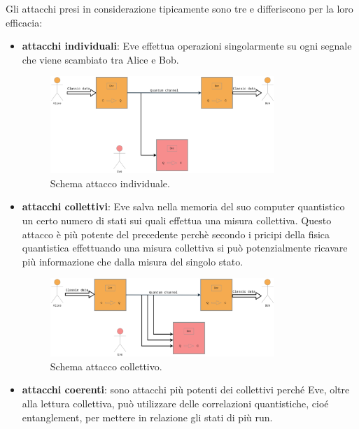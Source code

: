 Gli attacchi presi in considerazione tipicamente sono tre e differiscono per la loro efficacia:
\begin{itemize}
\item \textbf{attacchi individuali}: Eve effettua operazioni singolarmente su ogni segnale che viene scambiato tra Alice e Bob. 
\begin{figure}[H] 
\begin{center}
\includegraphics[width=0.8\textwidth]{figure/individual_attack.eps} 
\end{center}
\caption{Schema attacco individuale.} \label{fig:attacco-individuale}
\end{figure}
\item \textbf{attacchi collettivi}: Eve salva nella memoria del suo computer quantistico un certo numero di stati sui quali effettua una misura collettiva. Questo attacco \`e pi\`u potente del precedente perch\`e secondo i pricipi della fisica quantistica effettuando una misura collettiva si pu\`o potenzialmente ricavare pi\`u informazione che dalla misura del singolo stato.
\begin{figure}[H] 
\begin{center}
\includegraphics[width=0.8\textwidth]{figure/collective_attack.eps} 
\end{center}
\caption{Schema attacco collettivo.} \label{fig:attacco-collettivo}
\end{figure}
\item \textbf{attacchi coerenti}: sono attacchi pi\`u potenti dei collettivi perché Eve, oltre alla lettura collettiva, può utilizzare delle correlazioni quantistiche, cioé entanglement, per mettere in relazione gli stati di pi\`u run.

\end{itemize}
